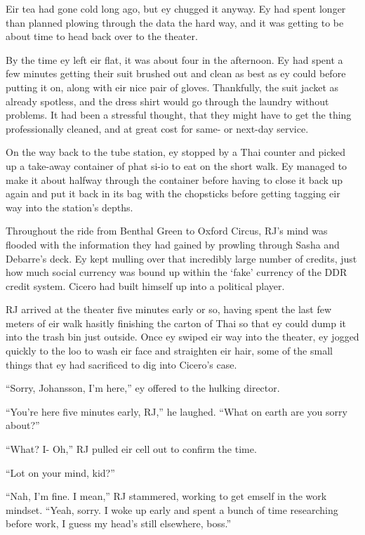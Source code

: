 Eir tea had gone cold long ago, but ey chugged it anyway. Ey had spent longer than planned plowing through the data the hard way, and it was getting to be about time to head back over to the theater.

\secdiv

By the time ey left eir flat, it was about four in the afternoon. Ey had spent a few minutes getting their suit brushed out and clean as best as ey could before putting it on, along with eir nice pair of gloves. Thankfully, the suit jacket as already spotless, and the dress shirt would go through the laundry without problems. It had been a stressful thought, that they might have to get the thing professionally cleaned, and at great cost for same- or next-day service.

On the way back to the tube station, ey stopped by a Thai counter and picked up a take-away container of phat si-io to eat on the short walk. Ey managed to make it about halfway through the container before having to close it back up again and put it back in its bag with the chopsticks before getting tagging eir way into the station's depths.

Throughout the ride from Benthal Green to Oxford Circus, RJ's mind was flooded with the information they had gained by prowling through Sasha and Debarre's deck. Ey kept mulling over that incredibly large number of credits, just how much social currency was bound up within the `fake' currency of the DDR credit system. Cicero had built himself up into a political player.

RJ arrived at the theater five minutes early or so, having spent the last few meters of eir walk hasitly finishing the carton of Thai so that ey could dump it into the trash bin just outside. Once ey swiped eir way into the theater, ey jogged quickly to the loo to wash eir face and straighten eir hair, some of the small things that ey had sacrificed to dig into Cicero's case.

``Sorry, Johansson, I'm here,'' ey offered to the hulking director.

``You're here five minutes early, RJ,'' he laughed. ``What on earth are you sorry about?''

``What? I- Oh,'' RJ pulled eir cell out to confirm the time.

``Lot on your mind, kid?''

``Nah, I'm fine. I mean,'' RJ stammered, working to get emself in the work mindset. ``Yeah, sorry. I woke up early and spent a bunch of time researching before work, I guess my head's still elsewhere, boss.''

